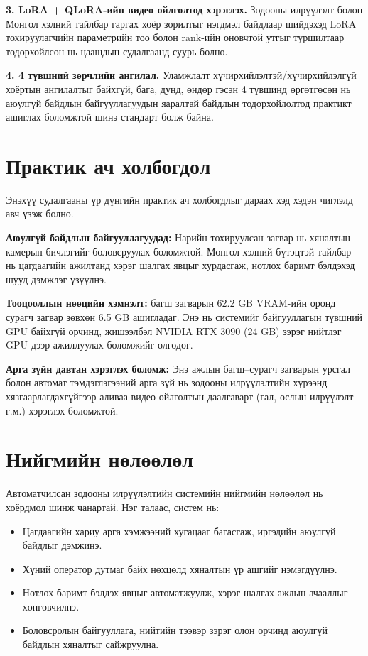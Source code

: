 \textbf{3. LoRA + QLoRA-ийн видео ойлголтод хэрэглэх.} Зодооны илрүүлэлт болон Монгол хэлний тайлбар гаргах хоёр зорилтыг нэгдмэл байдлаар шийдэхэд LoRA тохируулагчийн параметрийн тоо болон rank-ийн оновчтой утгыг туршилтаар тодорхойлсон нь цаашдын судалгаанд суурь болно.

\textbf{4. 4 түвшний зөрчлийн ангилал.} Уламжлалт хүчирхийлэлтэй/хүчирхийлэлгүй хоёртын ангилалтыг байхгүй, бага, дунд, өндөр гэсэн 4 түвшинд өргөтгөсөн нь аюулгүй байдлын байгууллагуудын яаралтай байдлын тодорхойлолтод практикт ашиглах боломжтой шинэ стандарт болж байна.

\section{Практик ач холбогдол}

Энэхүү судалгааны үр дүнгийн практик ач холбогдлыг дараах хэд хэдэн чиглэлд авч үзэж болно.

\textbf{Аюулгүй байдлын байгууллагуудад:} Нарийн тохируулсан загвар нь хяналтын камерын бичлэгийг боловсруулах боломжтой. Монгол хэлний бүтэцтэй тайлбар нь цагдаагийн ажилтанд хэрэг шалгах явцыг хурдасгаж, нотлох баримт бэлдэхэд шууд дэмжлэг үзүүлнэ.

\textbf{Тооцооллын нөөцийн хэмнэлт:} багш загварын 62.2 GB VRAM-ийн оронд сурагч загвар зөвхөн 6.5 GB ашигладаг. Энэ нь системийг байгууллагын түвшний GPU байхгүй орчинд, жишээлбэл NVIDIA RTX 3090 (24 GB) зэрэг нийтлэг GPU дээр ажиллуулах боломжийг олгодог.

\textbf{Арга зүйн давтан хэрэглэх боломж:} Энэ ажлын багш--сурагч загварын урсгал болон автомат тэмдэглэгээний арга зүй нь зодооны илрүүлэлтийн хүрээнд хязгаарлагдахгүйгээр аливаа видео ойлголтын даалгаварт (гал, ослын илрүүлэлт г.м.) хэрэглэх боломжтой.

\section{Нийгмийн нөлөөлөл}

Автоматчилсан зодооны илрүүлэлтийн системийн нийгмийн нөлөөлөл нь хоёрдмол шинж чанартай. Нэг талаас, систем нь:

\begin{itemize}
    \item Цагдаагийн хариу арга хэмжээний хугацааг багасгаж, иргэдийн аюулгүй байдлыг дэмжинэ.
    \item Хүний оператор дутмаг байх нөхцөлд хяналтын үр ашгийг нэмэгдүүлнэ.
    \item Нотлох баримт бэлдэх явцыг автоматжуулж, хэрэг шалгах ажлын ачааллыг хөнгөвчилнэ.
    \item Боловсролын байгууллага, нийтийн тээвэр зэрэг олон орчинд аюулгүй байдлын хяналтыг сайжруулна.
\end{itemize}

